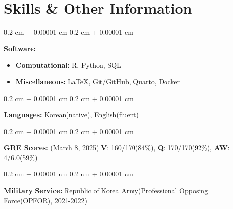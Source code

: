 \documentclass[10pt, letterpaper]{article}
\newenvironment{onecolentry}{
	\begin{adjustwidth}{
			0.2 cm + 0.00001 cm
		}{
			0.2 cm + 0.00001 cm
		}
	}{
	\end{adjustwidth}
} %
\begin{document}
\vspace{12pt}

	\section{Skills \& Other Information}
	
	\begin{onecolentry}
		\textbf{Software:} 
		\begin{itemize}
			\item \textbf{Computational:} R, Python, SQL
			\item \textbf{Miscellaneous:} \LaTeX, Git/GitHub, Quarto, Docker
		\end{itemize}
	\end{onecolentry}
	
	
	\vspace{0.2 cm}
	
	\begin{onecolentry}
		\textbf{Languages:} Korean(native), English(fluent)
	\end{onecolentry}
	
	\vspace{0.2 cm}
	
	\begin{onecolentry}
		\textbf{GRE Scores:} (March 8, 2025) \textbf{V}: 160/170(84\%), \textbf{Q}: 170/170(92\%), \textbf{AW}: 4/6.0(59\%)
	\end{onecolentry}
	
	\vspace{0.2 cm}

	\begin{onecolentry}
		\textbf{Military Service:} Republic of Korea Army(Professional Opposing Force(OPFOR), 2021-2022)
	\end{onecolentry}
	
\end{document}
